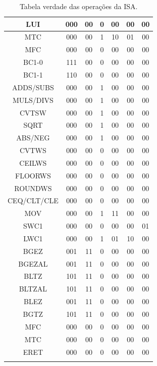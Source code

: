\documentclass[12pt]{article}
\begin{document}
\begin{longtable}{|c|c|c|c|c|c|c|}
		LUI & 000 & 00 & 0 & 00 & 00 & 00\\\hline	
		MTC & 000 & 00 & 1 & 10 & 01 & 00\\\hline
		MFC & 000 & 00 & 0 & 00 & 00 & 00\\\hline
		BC1-0 & 111 & 00 & 0 & 00 & 00 & 00\\\hline	
		BC1-1 & 110 & 00 & 0 & 00 & 00 & 00\\\hline
		ADDS/SUBS & 000 & 00 & 1 & 00 & 00 & 00\\\hline
		MULS/DIVS & 000 & 00 & 1 & 00 & 00 & 00\\\hline
		CVTSW & 000 & 00 & 1 & 00 & 00 & 00\\\hline	
		SQRT & 000 & 00 & 1 & 00 & 00 & 00\\\hline
		ABS/NEG & 000 & 00 & 1 & 00 & 00 & 00\\\hline
		CVTWS & 000 & 00 & 0 & 00 & 00 & 00\\\hline
		CEILWS & 000 & 00 & 0 & 00 & 00 & 00\\\hline
		FLOORWS & 000 & 00 & 0 & 00 & 00 & 00\\\hline
		ROUNDWS & 000 & 00 & 0 & 00 & 00 & 00\\\hline	
		CEQ/CLT/CLE & 000 & 00 & 0 & 00 & 00 & 00\\\hline
		MOV & 000 & 00 & 1 & 11 & 00 & 00\\\hline
		SWC1 & 000 & 00 & 0 & 00 & 00 & 01\\\hline	
		LWC1 & 000 & 00 & 1 & 01 & 10 & 00\\\hline
		BGEZ & 001 & 11 & 0 & 00 & 00 & 00\\\hline	
		BGEZAL & 001 & 11 & 0 & 00 & 00 & 00\\\hline
		BLTZ & 101 & 11 & 0 & 00 & 00 & 00\\\hline
		BLTZAL & 101 & 11 & 0 & 00 & 00 & 00\\\hline
		BLEZ & 001 & 11 & 0 & 00 & 00 & 00\\\hline
		BGTZ & 101 & 11 & 0 & 00 & 00 & 00\\\hline
		MFC & 000 & 00 & 0 & 00 & 00 & 00\\\hline	
		MTC & 000 & 00 & 0 & 00 & 00 & 00\\\hline
		ERET & 000 & 00 & 0 & 00 & 00 & 00\\\hline			
	\caption{Tabela verdade das operações da ISA.}
	\label{tab:req22}
\end{longtable}
\end{document}
